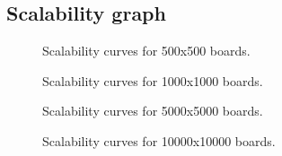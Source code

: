 \documentclass[a4paper,10pt]{article}
\begin{document}
	\subsection{Scalability graph}
		\begin{figure}[H]
		\centering
		\begin{minipage}[t]{0.55\linewidth}
		\end{minipage}%
		\begin{minipage}[t]{0.55\linewidth}
		\end{minipage}
		\caption{Scalability curves for 500x500 boards.}
		\label{500s}
	\end{figure}

	\begin{figure}[H]
		\centering
		\begin{minipage}[t]{0.55\linewidth}
		\end{minipage}%
		\begin{minipage}[t]{0.55\linewidth}
		\end{minipage}
		\caption{Scalability curves for 1000x1000 boards.}
		\label{1000s}
	\end{figure}

	\begin{figure}[H]
		\centering
		\begin{minipage}[t]{0.55\linewidth}
		\end{minipage}%
		\begin{minipage}[t]{0.55\linewidth}
		\end{minipage}
		\caption{Scalability curves for 5000x5000 boards.}
		\label{5000s}
	\end{figure}

	\begin{figure}[H]
		\centering
		\begin{minipage}[t]{0.55\linewidth}
		\end{minipage}%
		\begin{minipage}[t]{0.55\linewidth}
		\end{minipage}
		\caption{Scalability curves for 10000x10000 boards.}
		\label{10000s}
	\end{figure}
\end{document}
